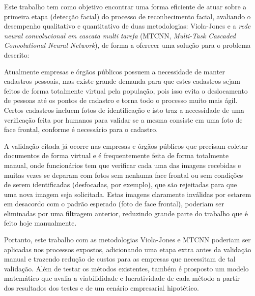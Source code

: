 Este trabalho tem como objetivo encontrar uma forma eficiente de atuar sobre a primeira etapa (detecção facial) do processo de reconhecimento facial, avaliando o desempenho qualitativo e quantitativo de duas metodologias: Viola-Jones e a \textit{rede neural convolucional em cascata multi tarefa} (MTCNN, \textit{Multi-Task Cascaded Convolutional Neural Network}), de forma a oferecer uma solução para o problema descrito:

Atualmente empresas e órgãos públicos possuem a necessidade de manter cadastros pessoais, mas existe grande demanda para que estes cadastros sejam feitos de forma totalmente virtual pela população, pois isso evita o deslocamento de pessoas até os pontos de cadastro e torna todo o processo muito mais ágil. Certos cadastros incluem fotos de identificação e isto traz a necessidade de uma verificação feita por humanos para validar se a mesma consiste em uma foto de face frontal, conforme é necessário para o cadastro.

A validação citada já ocorre nas empresas e órgãos públicos que precisam coletar documentos de forma virtual e é frequentemente feita de forma totalmente manual, onde funcionários tem que verificar cada uma das imagens recebidas e muitas vezes se deparam com fotos sem nenhuma face frontal ou sem condições de serem identificadas (desfocadas, por exemplo), que são rejeitadas para que uma nova imagem seja solicitada. Estas imagens claramente inválidas por estarem em desacordo com o padrão esperado (foto de face frontal), poderiam ser eliminadas por uma filtragem anterior, reduzindo grande parte do trabalho que é feito hoje manualmente.

Portanto, este trabalho com as metodologias Viola-Jones e MTCNN poderiam ser aplicadas nos processos expostos, adicionando uma etapa extra antes da validação manual e trazendo redução de custos para as empresas que necessitam de tal validação. Além de testar os métodos existentes, também é prosposto um modelo matemático que avalia a viabilididade e lucratividade de cada método a partir dos resultados dos testes e de um cenário empresarial hipotético.
